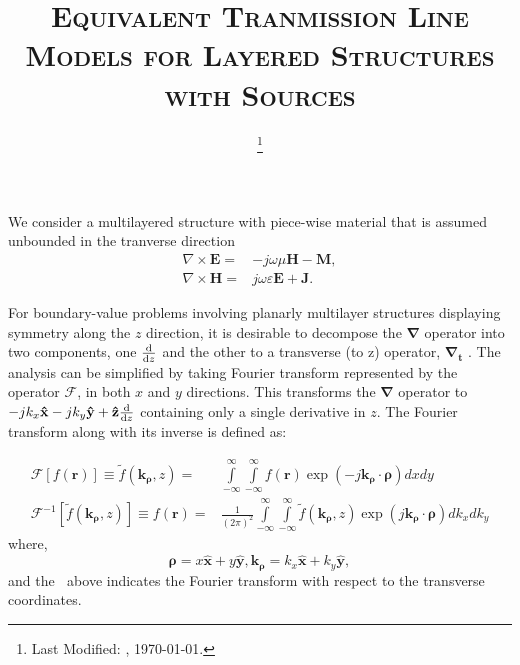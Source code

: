 \documentclass[11pt]{article}
\renewcommand{\v}[1]{\mathbf{#1}} %
\newcommand{\ti}[1]{\tilde{#1}} %
\renewcommand{\O}{\omega}  %
\newcommand{\E}{\varepsilon}  %
\renewcommand{\u}{\mu}  %
\newcommand{\p}{\rho}  %
\newcommand{\x}{\times}  %
\renewcommand{\inf}{\infty}  %
\newcommand{\infint}{\int\limits_{-\inf}^\inf} %
\newcommand{\del}{\nabla}  %
\renewcommand{\^}{\hat}  %
\begin{document}
  \title{\textsc{Equivalent Tranmission Line Models for Layered Structures with Sources}\\}
  \date{\footnote{Last Modified: \currenttime, \today.}}
  \maketitle
  We consider a multilayered structure with piece-wise material that is assumed unbounded in the tranverse direction
  \begin{subequations}
    \begin{align}
      \del\x{\v E} ={}& -j \O \u \v{H} -\v{M},
      \label{eq:E}\\
      \del\x{\v H} ={}& j \O \E \v{E} + \v{J}.
      \label{eq:H}
    \end{align}
    \label{eq:MaxE}
  \end{subequations}

  For boundary-value problems involving planarly multilayer structures displaying symmetry along the $z$ direction, it is desirable to decompose the $\v{\del}$ operator into two components, one $\dv{}{z}$ and the other to a transverse (to z) operator, $\v{\del_t}$ \cite[p. 64]{felsen1994radiation}. The analysis can be simplified by taking Fourier transform represented by the operator $\mathcal{F}$, in both $x$ and $y$ directions. This transforms the $\v{\del}$ operator to $-j k_x \v{\^{x}} - j k_y \v{\^{y}} + \v{\^{z}}\dv{}{z}$
  containing only a single derivative in $z$.
  The Fourier transform along with its inverse is defined as:

  \begin{subequations}
    \begin{align}
      \mathcal{F}[f(\v{r})] \equiv \ti{f}(\v{k_{\p}},z) ={}& \infint \infint
      f(\v{r}) \exp(-j \v{k_{\p}} \cdot \v{\p}) dx dy
      \label{eq:Fourier}\\
      \mathcal{F}^{-1}[\ti{f}(\v{k_{\p}},z)] \equiv f(\v{r}) ={}& \frac{1}{(2\pi)^2} \infint \infint \ti{f}(\v{k_{\p}},z)
      \exp(j \v{k_{\p}} \cdot \v{\p}) dk_x dk_y
      \label{eq:IFourier}
    \end{align}
    \label{eq:FT}
  \end{subequations}
  where,
  \begin{equation}
    \v{\p} = x\v{\^{x}} + y\v{\^{y}},
    \v{k_{\p}} = k_x\v{\^{x}} + k_y\v{\^{y}},
  \end{equation}
  and the $~$ above indicates the Fourier transform with respect to the transverse coordinates.
\end{document}
